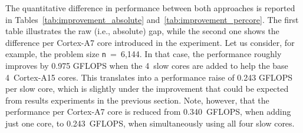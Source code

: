 %
%

The quantitative difference in performance between both approaches is
reported in Tables~\ref{tab:improvement_absolute} and~\ref{tab:improvement_percore}. 
The first table illustrates the raw (i.e., absolute) gap, while the second
one shows the difference per Cortex-A7 core introduced in the experiment. 
Let us consider, for example, the problem size {\tt n}~=~6,144. 
In that case, the performance roughly improves by 0.975 GFLOPS when the 4~slow cores are added to help the base 4~Cortex-A15 cores. 
This translates into a performance raise of 0.243 GFLOPS per slow core, which is slightly under the 
improvement that could be expected from results experiments in the previous section. 
Note, however, that the performance per Cortex-A7 core is reduced from 0.340~GFLOPS, when adding just one
core, to 0.243~GFLOPS, when simultaneously using all four slow cores.

\newcommand{\fg}[1]{\textcolor{ForestGreen}{#1}} %
\newcommand{\br}[1]{\textcolor{BrickRed}{#1}} %

